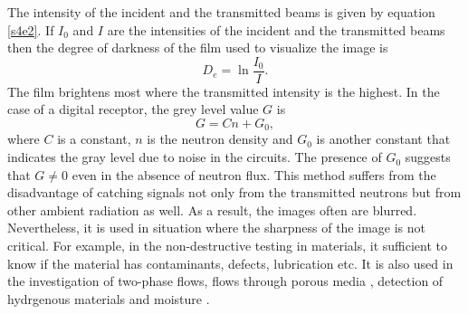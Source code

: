 \documentclass{article}
\numberwithin{equation}{section}
\begin{document}
The intensity of the incident and the transmitted beams is given by equation
\eqref{s4e2}. If $I_0$ and $I$ are the intensities of the incident and the
transmitted beams then the degree of darkness of the film used to visualize
the image is
\begin{equation}\label{s8e1}
D_e = \ln\frac{I_0}{I}.
\end{equation}
The film brightens most where the transmitted intensity is the highest. In the
case of a digital receptor, the grey level value $G$ is
\begin{equation}\label{s8e2}
G = Cn + G_0,
\end{equation}
where $C$ is a constant, $n$ is the neutron density and $G_0$ is another 
constant that indicates the gray level due to noise in the circuits. The 
presence of $G_0$ suggests that $G \ne 0$ even in the absence of neutron flux.
This method suffers from the disadvantage of catching signals not only from
the transmitted neutrons but from other ambient radiation as well. As a result,
the images often are blurred. Nevertheless, it is used in situation where the
sharpness of the image is not critical. For example, in the non-destructive
testing in materials, it sufficient to know if the material has contaminants,
defects, lubrication etc. It is also used in the investigation of two-phase
flows, flows through porous media \cite{anderson2008neutron}, detection of
hydrgenous materials and moisture \cite{richards2004neutron}.
\end{document}

